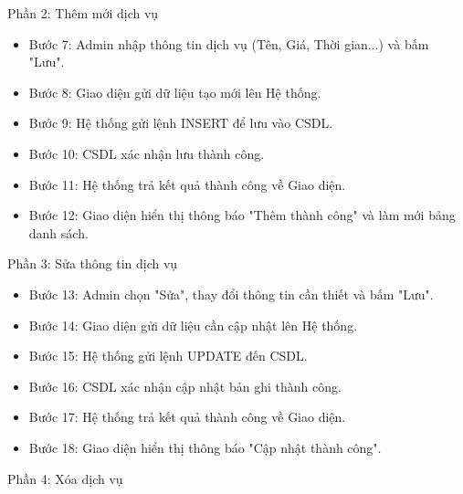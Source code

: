 \documentclass[../BTL.tex]{subfiles}
\begin{document}
Phần 2: Thêm mới dịch vụ

\begin{itemize}
\item
  Bước 7: Admin nhập thông tin dịch vụ (Tên, Giá, Thời gian...) và bấm
  "Lưu".
\item
  Bước 8: Giao diện gửi dữ liệu tạo mới lên Hệ thống.
\item
  Bước 9: Hệ thống gửi lệnh INSERT để lưu vào CSDL.
\item
  Bước 10: CSDL xác nhận lưu thành công.
\item
  Bước 11: Hệ thống trả kết quả thành công về Giao diện.
\item
  Bước 12: Giao diện hiển thị thông báo "Thêm thành công" và làm mới
  bảng danh sách.
\end{itemize}

Phần 3: Sửa thông tin dịch vụ

\begin{itemize}
\item
  Bước 13: Admin chọn "Sửa", thay đổi thông tin cần thiết và bấm "Lưu".
\item
  Bước 14: Giao diện gửi dữ liệu cần cập nhật lên Hệ thống.
\item
  Bước 15: Hệ thống gửi lệnh UPDATE đến CSDL.
\item
  Bước 16: CSDL xác nhận cập nhật bản ghi thành công.
\item
  Bước 17: Hệ thống trả kết quả thành công về Giao diện.
\item
  Bước 18: Giao diện hiển thị thông báo "Cập nhật thành công".
\end{itemize}

Phần 4: Xóa dịch vụ
\end{document}
